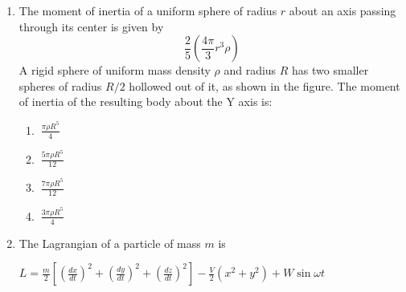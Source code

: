 \documentclass[journal]{IEEEtran}
\begin{document}
\begin{enumerate}
\item The moment of inertia of a uniform sphere of radius \( r \) about an axis passing through its center is given by
\[
\frac{2}{5} \left( \frac{4\pi}{3} r^3 \rho \right)
\]
A rigid sphere of uniform mass density \( \rho \) and radius \( R \) has two smaller spheres of radius \( R/2 \) hollowed out of it, as shown in the figure. The moment of inertia of the resulting body about the Y axis is:
\begin{center}
\end{center}
\begin{enumerate}
\item $ \ \frac{\pi \rho R^5}{4}
\quad $
\item $ \ \frac{5\pi \rho R^5}{12}
\quad $
\item $ \ \frac{7\pi \rho R^5}{12}
\quad $
\item $ \ \frac{3\pi \rho R^5}{4}
$
\end{enumerate}
\item The Lagrangian of a particle of mass \( m \) is

$L = \frac{m}{2} \left[ \left( \frac{dx}{dt} \right)^2 + \left( \frac{dy}{dt} \right)^2 + \left( \frac{dz}{dt} \right)^2 \right] - \frac{V}{2} \left( x^2 + y^2 \right) + W \sin \omega t $


\end{enumerate}
\end{document}
